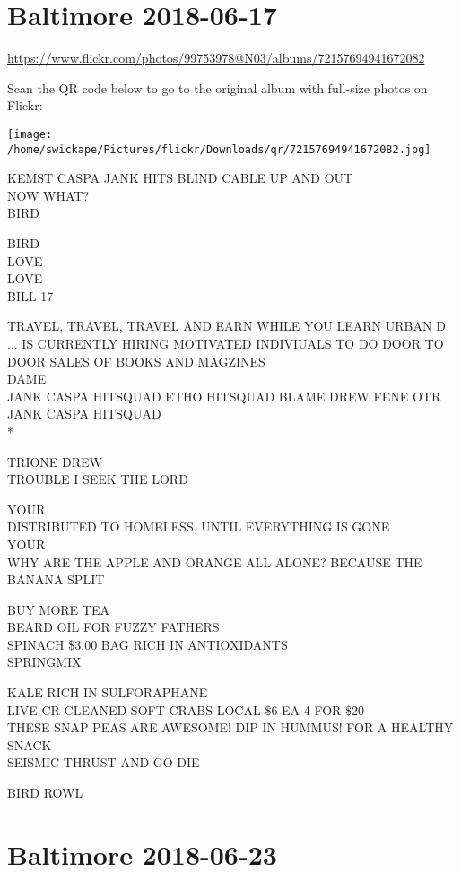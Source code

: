\documentclass[10pt,letterpaper]{article}
\begin{document}
\section*{Baltimore 2018-06-17}

\url{https://www.flickr.com/photos/99753978@N03/albums/72157694941672082}

Scan the QR code below to go to the original album with full-size photos on Flickr:

\texttt{[image: /home/swickape/Pictures/flickr/Downloads/qr/72157694941672082.jpg]}


KEMST CASPA JANK HITS BLIND CABLE UP AND OUT\\
NOW WHAT?\\
BIRD

BIRD\\
LOVE\\
LOVE\\
BILL 17

TRAVEL, TRAVEL, TRAVEL AND EARN WHILE YOU LEARN URBAN D ... IS CURRENTLY HIRING MOTIVATED INDIVIUALS TO DO DOOR TO DOOR SALES OF BOOKS AND MAGZINES\\
DAME\\
JANK CASPA HITSQUAD ETHO HITSQUAD BLAME DREW FENE OTR JANK CASPA HITSQUAD\\
*

TRIONE DREW\\
TROUBLE I SEEK THE LORD

YOUR\\
DISTRIBUTED TO HOMELESS, UNTIL EVERYTHING IS GONE\\
YOUR\\
WHY ARE THE APPLE AND ORANGE ALL ALONE?  BECAUSE THE BANANA SPLIT

BUY MORE TEA\\
BEARD OIL FOR FUZZY FATHERS\\
SPINACH \$3.00 BAG RICH IN ANTIOXIDANTS\\
SPRINGMIX

KALE RICH IN SULFORAPHANE\\
LIVE CR CLEANED SOFT CRABS LOCAL \$6 EA 4 FOR \$20\\
THESE SNAP PEAS ARE AWESOME!  DIP IN HUMMUS!  FOR A HEALTHY SNACK\\
SEISMIC THRUST AND GO DIE

BIRD ROWL


\section*{Baltimore 2018-06-23}
\end{document}
